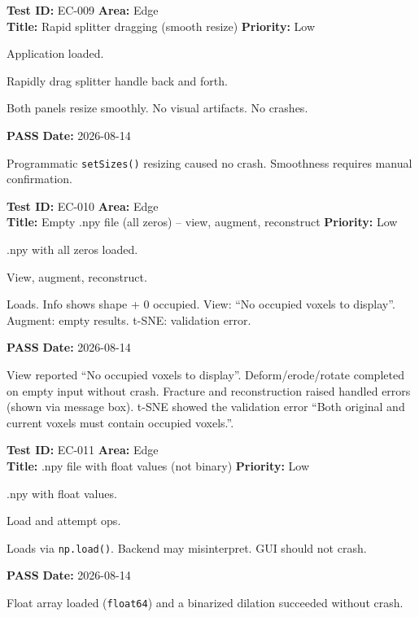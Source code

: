 \documentclass[12pt,a4paper]{article}
\newcommand{\pass}{\textcolor{paleogreen}{\textbf{PASS}}}
\newcommand{\testheader}[4]{%
  \smallskip
  \noindent\textbf{Test ID:} #1 \hfill \textbf{Area:} #2 \\
  \textbf{Title:} #3 \hfill \textbf{Priority:} #4
}
\newenvironment{testbody}{%
  \begin{description}[leftmargin=2em,style=nextline]
}{%
  \end{description}
  \smallskip
}
\begin{document}
\testheader{EC-009}{Edge}{Rapid splitter dragging (smooth resize)}{Low}
\begin{testbody}
  \item[\textbf{Preconditions:}] Application loaded.
  \item[\textbf{Steps:}] Rapidly drag splitter handle back and forth.
  \item[\textbf{Expected Result:}] Both panels resize smoothly. No visual
        artifacts. No crashes.
  \item[\textbf{Status:}] \pass{} \hspace{1em} \textbf{Date:} 2026-08-14
  \item[\textbf{Notes:}] Programmatic \texttt{setSizes()} resizing caused no
        crash. Smoothness requires manual confirmation.
\end{testbody}

\testheader{EC-010}{Edge}{Empty .npy file (all zeros) -- view, augment, reconstruct}{Low}
\begin{testbody}
  \item[\textbf{Preconditions:}] .npy with all zeros loaded.
  \item[\textbf{Steps:}] View, augment, reconstruct.
  \item[\textbf{Expected Result:}] Loads. Info shows shape + 0 occupied.
        View: ``No occupied voxels to display''. Augment: empty results.
        t-SNE: validation error.
  \item[\textbf{Status:}] \pass{} \hspace{1em} \textbf{Date:} 2026-08-14
  \item[\textbf{Notes:}] View reported ``No occupied voxels to display''.
        Deform/erode/rotate completed on empty input without crash. Fracture
        and reconstruction raised handled errors (shown via message box).
        t-SNE showed the validation error ``Both original and current voxels
        must contain occupied voxels.''.
\end{testbody}

\testheader{EC-011}{Edge}{.npy file with float values (not binary)}{Low}
\begin{testbody}
  \item[\textbf{Preconditions:}] .npy with float values.
  \item[\textbf{Steps:}] Load and attempt ops.
  \item[\textbf{Expected Result:}] Loads via \texttt{np.load()}. Backend may
        misinterpret. GUI should not crash.
  \item[\textbf{Status:}] \pass{} \hspace{1em} \textbf{Date:} 2026-08-14
  \item[\textbf{Notes:}] Float array loaded (\texttt{float64}) and a binarized
        dilation succeeded without crash.
\end{testbody}
\end{document}
